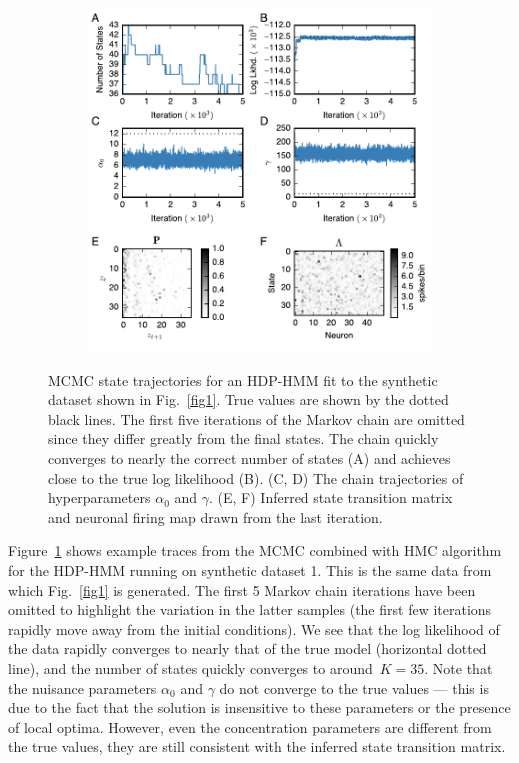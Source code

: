  
\begin{figure}
  \centering
  \begin{subfigure}[t]{5in}
    \includegraphics[width=\textwidth]{figures/ch5/Fig2.pdf}
  \end{subfigure}
  \caption[Inference results for an HDP-HMM fit to synthetic
    data]{MCMC state trajectories for an HDP-HMM fit to the synthetic
    dataset shown in Fig.~\ref{fig1}. True values are shown by the
    dotted black lines. The first five iterations of the Markov chain
    are omitted since they differ greatly from the final states. The
    chain quickly converges to nearly the correct number of states (A)
    and achieves close to the true log likelihood (B). (C, D) The
    chain trajectories of hyperparameters $\alpha_0$ and $\gamma$. (E,
    F) Inferred state transition matrix and neuronal firing map drawn
    from the last iteration.  }
  \label{fig2}
\end{figure}

Figure~\ref{fig2} shows example traces from the MCMC combined with HMC
algorithm for the HDP-HMM running on synthetic dataset 1. This is the
same data from which Fig.~\ref{fig1} is generated. The first 5 Markov
chain iterations have been omitted to highlight the variation in the
latter samples (the first few iterations rapidly move away from the
initial conditions). We see that the log likelihood of the data
rapidly converges to nearly that of the true model (horizontal dotted
line), and the number of states quickly converges to around~$K=35$.
Note that the nuisance parameters $\alpha_0$ and $\gamma$ do not
converge to the true values --- this is due to the fact that the
solution is insensitive to these parameters or the presence of local
optima.  However, even the concentration parameters are different from
the true values, they are still consistent with the inferred state
transition matrix.

